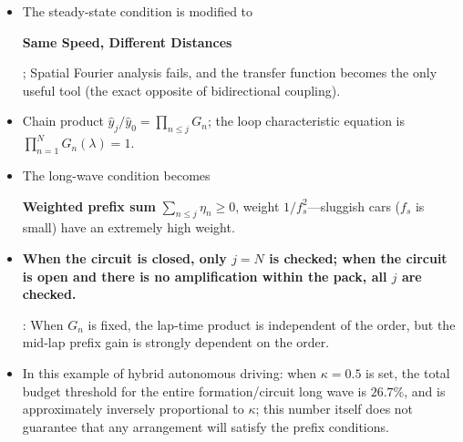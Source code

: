 \documentclass[11pt,a4paper,openany]{book}
\numberwithin{equation}{chapter}
\numberwithin{figure}{chapter}
\numberwithin{table}{chapter}
\begin{document}
\begin{tcolorbox}[keybox]
\begin{itemize}[leftmargin=1.6em,itemsep=4pt]
\item




 The steady-state condition is modified to




\textbf{Same Speed, Different Distances}




; Spatial Fourier analysis fails, and the transfer function becomes the only useful tool (the exact opposite of bidirectional coupling).







\item




 Chain product $\hat y_j/\hat y_0=\prod_{n\le j}G_n$; the loop characteristic equation is $\prod_{n=1}^N G_n(\lambda)=1$.







\item




 The long-wave condition becomes




\textbf{Weighted prefix sum} $\sum_{n\le j}\eta_n\ge0$, weight $1/f_s^2$—sluggish cars ($f_s$ is small) have an extremely high weight.







\item \textbf{When the circuit is closed, only $j=N$ is checked; when the circuit is open and there is no amplification within the pack, all $j$ are checked.}




: When $G_n$ is fixed, the lap-time product is independent of the order, but the mid-lap prefix gain is strongly dependent on the order.







\item




 In this example of hybrid autonomous driving: when $\kappa=0.5$ is set, the total budget threshold for the entire formation/circuit long wave is $26.7\%$, and is approximately inversely proportional to $\kappa$; this number itself does not guarantee that any arrangement will satisfy the prefix conditions.








\end{itemize}
\end{tcolorbox}
\end{document}
